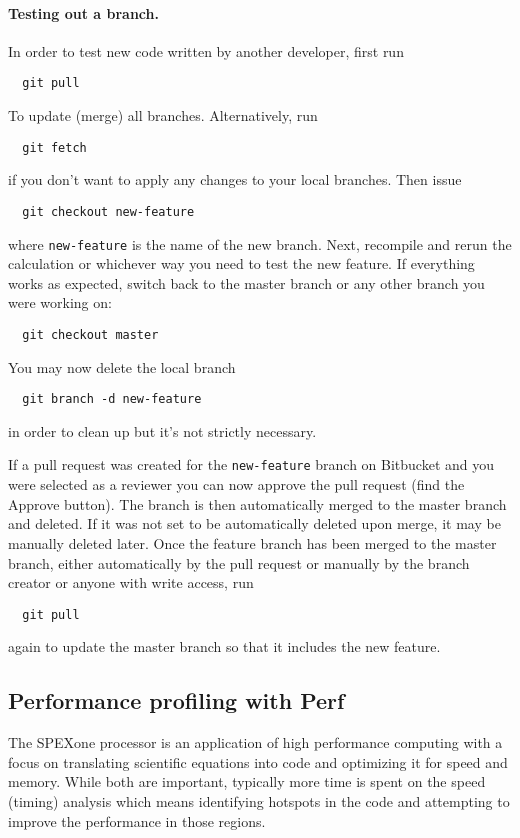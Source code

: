 \documentclass{article}
\begin{document}
\paragraph{Testing out a branch.} In order to test new code written by another developer, first run
\begin{lstlisting}
  git pull
\end{lstlisting}
To update (merge) all branches. Alternatively, run
\begin{lstlisting}
  git fetch
\end{lstlisting}
if you don't want to apply any changes to your local branches. Then issue
\begin{lstlisting}
  git checkout new-feature
\end{lstlisting}
where \lstinline!new-feature! is the name of the new branch. Next, recompile and rerun the calculation or whichever way you need to test the new feature. If everything works as expected, switch back to the master branch or any other branch you were working on:
\begin{lstlisting}
  git checkout master
\end{lstlisting}
You may now delete the local branch
\begin{lstlisting}
  git branch -d new-feature
\end{lstlisting}
in order to clean up but it's not strictly necessary.

If a pull request was created for the \lstinline!new-feature! branch on Bitbucket and you were selected as a reviewer you can now approve the pull request (find the Approve button). The branch is then automatically merged to the master branch and deleted. If it was not set to be automatically deleted upon merge, it may be manually deleted later. Once the feature branch has been merged to the master branch, either automatically by the pull request or manually by the branch creator or anyone with write access, run
\begin{lstlisting}
  git pull
\end{lstlisting}
again to update the master branch so that it includes the new feature.

\subsection{Performance profiling with Perf}

The SPEXone processor is an application of high performance computing with a focus on translating scientific equations into code and optimizing it for speed and memory. While both are important, typically more time is spent on the speed (timing) analysis which means identifying hotspots in the code and attempting to improve the performance in those regions.
\end{document}
